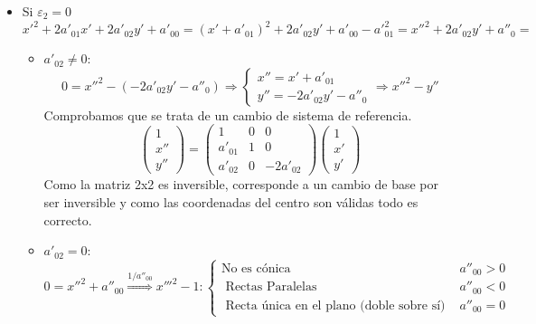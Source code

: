 \documentclass[10pt,a4paper,openright]{book}
\begin{document}
\begin{itemize}
\item Si $\varepsilon_2 = 0$
$$x'^2 + 2 a'_{01} x' + 2  a'_{02}y' + a'_{00} = (x' + a'_{01} )^2 + 2  a'_{02}y'  + a'_{00}- a'^2_{01} = x''^2 + 2  a'_{02}y'  + a''_0 = $$
	\begin{itemize}
	\item $ a'_{02} \neq 0$:
	$$ 0 = x''^2 - (-2  a'_{02}y'  - a''_0)  \Rightarrow \begin{cases}
x'' = x' + a'_{01} \\ y'' = -2  a'_{02}y'  - a''_0
\end{cases} \Rightarrow x''^2 - y'' $$
Comprobamos que se trata de un cambio de sistema de referencia.
$$\begin{pmatrix}
1 \\ x'' \\ y''
\end{pmatrix} =
\left(\begin{array}{c|cc}
1 & 0 & 0 \\
\hline
a'_{01} & 1  & 0  \\
a'_{02} &  0 & - 2 a'_{02}
\end{array}
\right)
\begin{pmatrix}
1 \\ x' \\ y'
\end{pmatrix}$$
Como la matriz 2x2 es inversible, corresponde a un cambio de base por ser inversible y como las coordenadas del centro son válidas todo es correcto.

 	\item $a'_{02} = 0$:
 	$$0 = x''^2 + a''_{00} \stackrel{1/a''_{00}}{\Rightarrow} x'''^2 - 1 : \begin{cases} \mbox{No es cónica} & a''_{00} > 0 \\
\mbox{ Rectas Paralelas } & a''_{00} < 0 \\
\mbox{ Recta única en el plano (doble sobre sí) } &a''_{00} = 0\end{cases}$$
	\end{itemize}
\end{itemize}
\end{document}

